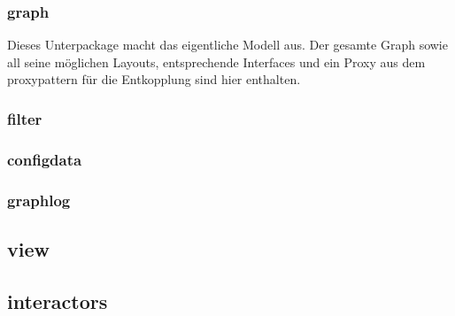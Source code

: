     \subsubsection{graph}
    \label{subsubsec:graph}
    Dieses Unterpackage macht das eigentliche Modell aus. Der gesamte Graph sowie
    all seine möglichen Layouts, entsprechende Interfaces und ein Proxy aus dem
    \gls{proxypattern} für die Entkopplung sind hier enthalten.
    \subsubsection{filter}
    \label{subsubsec:filter}

    \subsubsection{configdata}
    \label{subsubsec:configdata}

    \subsubsection{graphlog}
    \label{subsubsec:graphlog}


\subsection{view}
\label{subsec:view}

\subsection{interactors}
\label{subsec:interactors}
